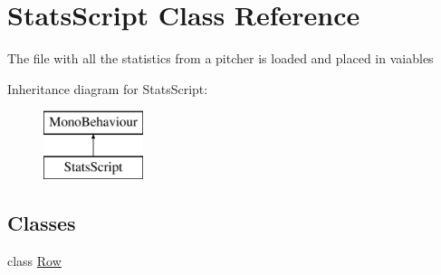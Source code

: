 \hypertarget{class_stats_script}{}\section{Stats\+Script Class Reference}
\label{class_stats_script}


The file with all the statistics from a pitcher is loaded and placed in vaiables  


Inheritance diagram for Stats\+Script\+:\begin{figure}[H]
\begin{center}
\leavevmode
\includegraphics[height=2.000000cm]{class_stats_script}
\end{center}
\end{figure}
\subsection*{Classes}
\begin{DoxyCompactItemize}
\item 
class \hyperlink{class_stats_script_1_1_row}{Row}
\end{DoxyCompactItemize}
